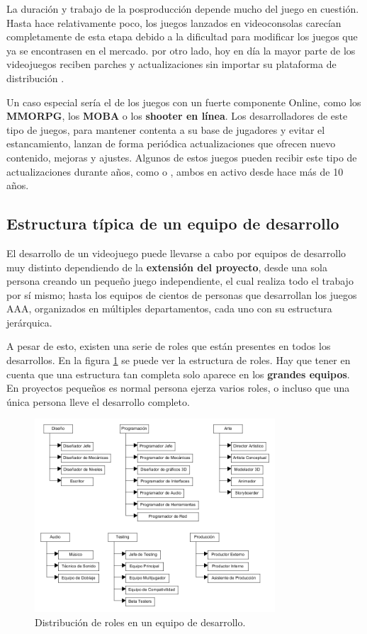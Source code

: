La duración y trabajo de la posproducción depende mucho del juego en cuestión. Hasta hace relativamente poco, los juegos lanzados en videoconsolas carecían completamente de esta etapa debido a la dificultad para modificar los juegos que ya se encontrasen en el mercado. por otro lado, hoy en día la mayor parte de los videojuegos reciben parches y actualizaciones sin importar su plataforma de distribución \cite{development_and_production}.

Un caso especial sería el de los juegos con un fuerte componente Online, como los \textbf{MMORPG}, los \textbf{MOBA} o los \textbf{shooter en línea}. Los desarrolladores de este tipo de juegos, para mantener contenta a su base de jugadores y evitar el estancamiento, lanzan de forma periódica actualizaciones que ofrecen nuevo contenido, mejoras y ajustes. Algunos de estos juegos pueden recibir este tipo de actualizaciones durante años, como  o , ambos en activo desde hace más de 10 años.

\subsection{Estructura típica de un equipo de desarrollo}
El desarrollo de un videojuego puede llevarse a cabo por equipos de desarrollo muy distinto dependiendo de la \textbf{extensión del proyecto}, desde una sola persona creando un pequeño juego independiente, el cual realiza todo el trabajo por sí mismo; hasta los equipos de cientos de personas que desarrollan los juegos AAA, organizados en múltiples departamentos, cada uno con su estructura jerárquica.

A pesar de esto, existen una serie de roles que están presentes en todos los desarrollos. En la figura \ref{table-roles} se puede ver la estructura de roles. Hay que tener en cuenta que una estructura tan completa solo aparece en los \textbf{grandes equipos}. En proyectos pequeños es normal persona ejerza varios roles, o incluso que una única persona lleve el desarrollo completo.

\begin{figure}[h]
    \centering
    \includegraphics[width=0.8\textwidth]{images/estadodelarte/desarrollo/table-roles}
    \caption{Distribución de roles en un equipo de desarrollo.}
    \label{table-roles}
\end{figure}

